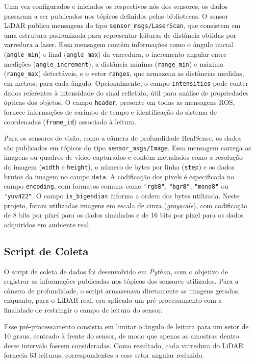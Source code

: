 Uma vez configurados e iniciados os respectivos nós dos sensores, os dados passaram a ser publicados nos tópicos definidos pelas bibliotecas. O sensor LiDAR publica mensagens do tipo \texttt{sensor\_msgs/LaserScan}, que consistem em uma estrutura padronizada para representar leituras de distância obtidas por varredura a laser. Essa mensagem contém informações como o ângulo inicial (\texttt{angle\_min}) e final (\texttt{angle\_max}) da varredura, o incremento angular entre medições (\texttt{angle\_increment}), a distância mínima (\texttt{range\_min}) e máxima (\texttt{range\_max}) detectáveis, e o vetor \texttt{ranges}, que armazena as distâncias medidas, em metros, para cada ângulo. Opcionalmente, o campo \texttt{intensities} pode conter dados referentes à intensidade do sinal refletido, útil para análise de propriedades ópticas dos objetos. O campo \texttt{header}, presente em todas as mensagens ROS, fornece informações de carimbo de tempo e identificação do sistema de coordenadas (\texttt{frame\_id}) associado à leitura.

Para os sensores de visão, como a câmera de profundidade RealSense, os dados são publicados em tópicos do tipo \texttt{sensor\_msgs/Image}. Essa mensagem carrega as imagens ou quadros de vídeo capturados e contém metadados como a resolução da imagem (\texttt{width} e \texttt{height}), o número de bytes por linha (\texttt{step}) e os dados brutos da imagem no campo \texttt{data}. A codificação dos pixels é especificada no campo \texttt{encoding}, com formatos comuns como \texttt{"rgb8"}, \texttt{"bgr8"}, \texttt{"mono8"} ou \texttt{"yuv422"}. O campo \texttt{is\_bigendian} informa a ordem dos bytes utilizada. Neste projeto, foram utilizadas imagens em escala de cinza (\textit{grayscale}), com codificação de 8 bits por pixel para os dados simulados e de 16 bits por pixel para os dados adquiridos em ambiente real.

\subsection{Script de Coleta}

O script de coleta de dados foi desenvolvido em \textit{Python}, com o objetivo de registrar as informações publicadas nos tópicos dos sensores utilizados. Para a câmera de profundidade, o script armazenava diretamente as imagens geradas, enquanto, para o LiDAR real, era aplicado um pré-processamento com a finalidade de restringir o campo de leitura do sensor.

Esse pré-processamento consistia em limitar o ângulo de leitura para um setor de 10 graus, centrado à frente do sensor, de modo que apenas as amostras dentro desse intervalo fossem consideradas. Como resultado, cada varredura do LiDAR fornecia 63 leituras, correspondentes a esse setor angular reduzido.

